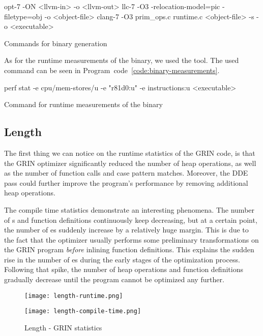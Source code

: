 \documentclass[main.tex]{subfiles}
\begin{document}
	\begin{codeFloat}[H]
		\begin{bash}
			opt-7 -ON <llvm-in> -o <llvm-out> 
			llc-7 -O3 -relocation-model=pic -filetype=obj -o <object-file>
			clang-7 -O3 prim_ops.c runtime.c <object-file> -s -o <executable>
		\end{bash}
		\caption{Commands for binary generation}
		\label{code:binary-gen}
	\end{codeFloat}
	
	As for the runtime measurements of the binary, we used the  tool. The used command can be seen in Program~code~\ref{code:binary-measurements}.

	\begin{codeFloat}[H]
		\begin{bash}
			perf stat -e cpu/mem-stores/u -e "r81d0:u" -e instructions:u <executable>
		\end{bash}
		\caption{Command for runtime measurements of the binary}
		\label{code:binary-measurements}
	\end{codeFloat}
	
	
	\subsection{Length}
	
	The first thing we can notice on the runtime statistics of the GRIN code, is that the GRIN optimizer significantly reduced the number of heap operations, as well as the number of function calls and case pattern matches. Moreover, the DDE pass could further improve the program's performance by removing additional heap operations.
	
	The compile time statistics demonstrate an interesting phenomena. The number of s and function definitions continuously keep decreasing, but at a certain point, the number of es suddenly increase by a relatively huge margin. This is due to the fact that the optimizer usually performs some preliminary transformations on the GRIN program \emph{before} inlining function definitions. This explains the sudden rise in the number of es during the early stages of the optimization process. Following that spike, the number of heap operations and function definitions gradually decrease until the program cannot be optimized any further.
	
	\begin{figure}[h]
		\hspace{-0.5cm}
		\renewcommand{\figurename}{Diagram}
		\caption{Length - GRIN statistics}
		\label{diagram:length-stats}
		\addtocounter{figure}{-1}
		\begin{minipage}{0.5\textwidth}
			\label{diagram:length-stats-rt}
			\texttt{[image: length-runtime.png]}
		\end{minipage}
		\begin{minipage}{0.5\textwidth}
			\label{diagram:length-stats-ct}
			\texttt{[image: length-compile-time.png]}
		\end{minipage}
	\end{figure}
\end{document}
